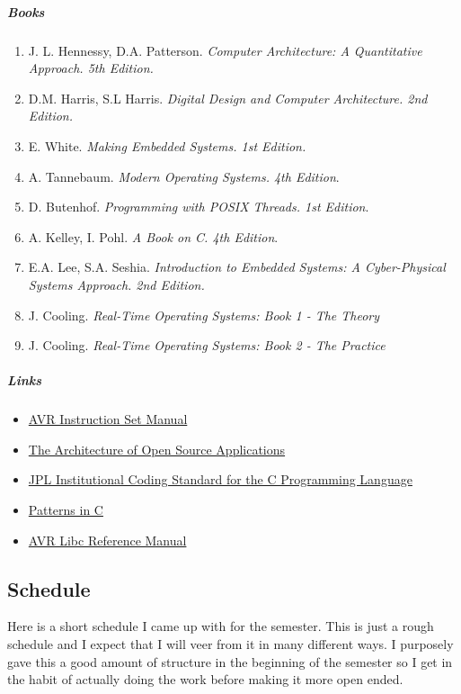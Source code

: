 \documentclass[12pt,a4paper,oneside,notitlepage]{article}
\begin{document}
\subparagraph*{Books}
\begin{enumerate}
	\item J. L. Hennessy, D.A. Patterson. \textit{Computer Architecture: A Quantitative Approach. 5th Edition.}
	\item D.M. Harris, S.L Harris. \textit{Digital Design and Computer Architecture. 2nd Edition.}
	\item E. White. \textit{Making Embedded Systems. 1st Edition.}
	\item A. Tannebaum. \textit{Modern Operating Systems. 4th Edition}.
	\item D. Butenhof. \textit{Programming with POSIX Threads. 1st Edition}.
	\item A. Kelley, I. Pohl. \textit{A Book on C. 4th Edition}.
	\item E.A. Lee, S.A. Seshia. \textit{Introduction to Embedded Systems: A Cyber-Physical Systems Approach. 2nd Edition.}
	\item J. Cooling. \textit{Real-Time Operating Systems: Book 1 - The Theory}
	\item J. Cooling. \textit{Real-Time Operating Systems: Book 2 - The Practice}
\end{enumerate}

\subparagraph*{Links}
\begin{itemize}
	\item \href{http://ww1.microchip.com/downloads/en/DeviceDoc/Atmel-0856-AVR-Instruction-Set-Manual.pdf}{AVR Instruction Set Manual}
	\item \href{http://aosabook.org/en/index.html}{The Architecture of Open Source Applications}
	\item \href{https://lars-lab.jpl.nasa.gov/JPL_Coding_Standard_C.pdf}{JPL Institutional Coding Standard for the C Programming Language}
	\item \href{https://leanpub.com/patternsinc}{Patterns in C}
	\item \href{https://www.microchip.com/webdoc/AVRLibcReferenceManual/index.html}{AVR Libc Reference Manual}
	
	
\end{itemize}


\subsection*{Schedule}

Here is a short schedule I came up with for the semester. This is just a rough schedule and I expect that I will veer from it in many different ways. I purposely gave this a good amount of structure in the beginning of the semester so I get in the habit of actually doing the work before making it more open ended.
\end{document}
